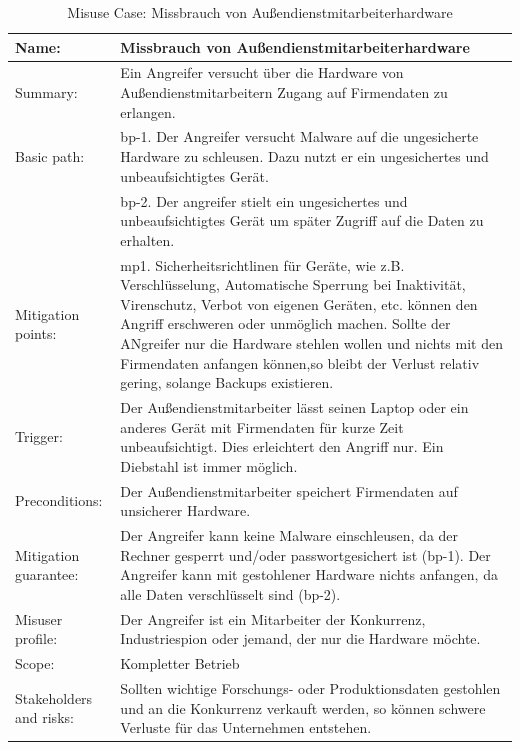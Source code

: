 \begin{table}[h]
\scriptsize
\centering
\caption{Misuse Case: Missbrauch von Außendienstmitarbeiterhardware}
\label{tab:MisuseCaseTemplate}
\begin{tabular}{p{}p{}}
\hline 
Name: & Missbrauch von Außendienstmitarbeiterhardware \\ 
\hline 
Summary: & Ein Angreifer versucht über die Hardware von Außendienstmitarbeitern Zugang auf Firmendaten zu erlangen.\\
\hline
Basic path: & bp-1. Der Angreifer versucht Malware auf die ungesicherte Hardware zu schleusen. Dazu nutzt er ein ungesichertes und unbeaufsichtigtes Gerät.\\
 & bp-2. Der angreifer stielt ein ungesichertes und unbeaufsichtigtes Gerät um später Zugriff auf die Daten zu erhalten.\\ 
\hline 
Mitigation points: & mp1. Sicherheitsrichtlinen für Geräte, wie z.B. Verschlüsselung, Automatische Sperrung bei Inaktivität, Virenschutz, Verbot von eigenen Geräten, etc. können den Angriff erschweren oder unmöglich machen. Sollte der ANgreifer nur die Hardware stehlen wollen und nichts mit den Firmendaten anfangen können,so bleibt der Verlust relativ gering, solange Backups existieren.\\ 
\hline 
Trigger: & Der Außendienstmitarbeiter lässt seinen Laptop oder ein anderes Gerät mit Firmendaten für kurze Zeit unbeaufsichtigt. Dies erleichtert den Angriff nur. Ein Diebstahl ist immer möglich.\\ 
\hline 
Preconditions: & Der Außendienstmitarbeiter speichert Firmendaten auf unsicherer Hardware.\\ 
\hline 
Mitigation guarantee: & Der Angreifer kann keine Malware einschleusen, da der Rechner gesperrt und/oder passwortgesichert ist (bp-1). Der Angreifer kann mit gestohlener Hardware nichts anfangen, da alle Daten verschlüsselt sind (bp-2).\\ 
\hline 
Misuser profile: & Der Angreifer ist ein Mitarbeiter der Konkurrenz, Industriespion oder jemand, der nur die Hardware möchte. \\ 
\hline 
Scope: & Kompletter Betrieb \\ 
\hline 
Stakeholders and risks: & Sollten wichtige Forschungs- oder Produktionsdaten gestohlen und an die Konkurrenz verkauft werden, so können schwere Verluste für das Unternehmen entstehen. \\ 
\hline 
\end{tabular} 
\end{table}